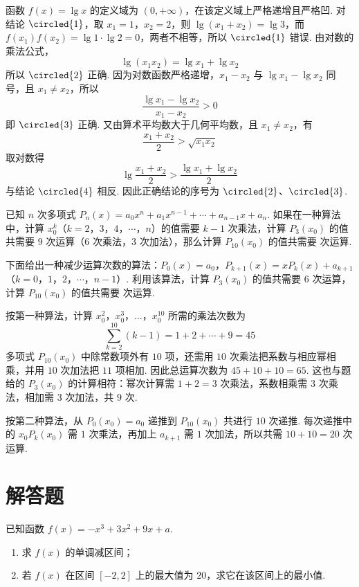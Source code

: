 \begin{solution}
函数 \(f(x)=\lg x\) 的定义域为 \((0,+\infty)\)，在该定义域上严格递增且严格凹. 对结论 \(\circled{1}\)，取 \(x_1=1\)，\(x_2=2\)，则 \(\lg(x_1+x_2)=\lg3\)，而 \(f(x_1)f(x_2)=\lg1\cdot\lg2=0\)，两者不相等，所以 \(\circled{1}\) 错误. 由对数的乘法公式，
\[
\lg(x_1x_2)=\lg x_1+\lg x_2
\]
所以 \(\circled{2}\) 正确. 因为对数函数严格递增，\(x_1-x_2\) 与 \(\lg x_1-\lg x_2\) 同号，且 \(x_1\ne x_2\)，所以
\[
\frac{\lg x_1-\lg x_2}{x_1-x_2}>0
\]
即 \(\circled{3}\) 正确. 又由算术平均数大于几何平均数，且 \(x_1\ne x_2\)，有
\[
\frac{x_1+x_2}{2}>\sqrt{x_1x_2}
\]
取对数得
\[
\lg\frac{x_1+x_2}{2}>\frac{\lg x_1+\lg x_2}{2}
\]
与结论 \(\circled{4}\) 相反. 因此正确结论的序号为 \(\circled{2}\)、\(\circled{3}\).
\end{solution}

\begin{problem}
已知 \(n\) 次多项式 \(P_n(x)=a_0x^n+a_1x^{n-1}+\cdots+a_{n-1}x+a_n\). 如果在一种算法中，计算 \(x_0^k\)（\(k=2\)，\(3\)，\(4\)，\(\cdots\)，\(n\)）的值需要 \(k-1\) 次乘法，计算 \(P_3(x_0)\) 的值共需要 \(9\) 次运算（\(6\) 次乘法，\(3\) 次加法），那么计算 \(P_{10}(x_0)\) 的值共需要\fillinblank{} 次运算.

下面给出一种减少运算次数的算法：\(P_0(x)=a_0\)，\(P_{k+1}(x)=xP_k(x)+a_{k+1}\)（\(k=0\)，\(1\)，\(2\)，\(\cdots\)，\(n-1\)）. 利用该算法，计算 \(P_3(x_0)\) 的值共需要 \(6\) 次运算，计算 \(P_{10}(x_0)\) 的值共需要\fillinblank{} 次运算.
\end{problem}

\begin{solution}
按第一种算法，计算 \(x_0^2\)，\(x_0^3\)，\(\ldots\)，\(x_0^{10}\) 所需的乘法次数为
\[
\sum_{k=2}^{10}(k-1)=1+2+\cdots+9=45
\]
多项式 \(P_{10}(x_0)\) 中除常数项外有 \(10\) 项，还需用 \(10\) 次乘法把系数与相应幂相乘，并用 \(10\) 次加法把 \(11\) 项相加. 因此总运算次数为 \(45+10+10=65\). 这也与题给的 \(P_3(x_0)\) 的计算相符：幂次计算需 \(1+2=3\) 次乘法，系数相乘需 \(3\) 次乘法，相加需 \(3\) 次加法，共 \(9\) 次.

按第二种算法，从 \(P_0(x_0)=a_0\) 递推到 \(P_{10}(x_0)\) 共进行 \(10\) 次递推. 每次递推中的 \(x_0P_k(x_0)\) 需 \(1\) 次乘法，再加上 \(a_{k+1}\) 需 \(1\) 次加法，所以共需 \(10+10=20\) 次运算.
\end{solution}

\section{解答题}
\begin{problem}
已知函数 \(f(x)=-x^3+3x^2+9x+a\).

\begin{enumerate}
\item 求 \(f(x)\) 的单调减区间；
\item 若 \(f(x)\) 在区间 \([-2,2]\) 上的最大值为 \(20\)，求它在该区间上的最小值.
\end{enumerate}
\end{problem}


